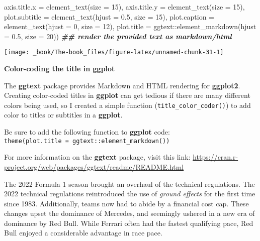 \documentclass[
]{book}
\newenvironment{Shaded}{\begin{snugshade}}{\end{snugshade}}
\newcommand{\AttributeTok}[1]{\textcolor[rgb]{0.77,0.63,0.00}{#1}}
\newcommand{\DecValTok}[1]{\textcolor[rgb]{0.00,0.00,0.81}{#1}}
\newcommand{\DocumentationTok}[1]{\textcolor[rgb]{0.56,0.35,0.01}{\textbf{\textit{#1}}}}
\newcommand{\FloatTok}[1]{\textcolor[rgb]{0.00,0.00,0.81}{#1}}
\newcommand{\FunctionTok}[1]{\textcolor[rgb]{0.00,0.00,0.00}{#1}}
\newcommand{\NormalTok}[1]{#1}
\newcommand{\SpecialCharTok}[1]{\textcolor[rgb]{0.00,0.00,0.00}{#1}}
\begin{document}
\begin{Shaded}
\begin{Highlighting}[]
        \AttributeTok{axis.title.x =} \FunctionTok{element\_text}\NormalTok{(}\AttributeTok{size =} \DecValTok{15}\NormalTok{),}
        \AttributeTok{axis.title.y =} \FunctionTok{element\_text}\NormalTok{(}\AttributeTok{size =} \DecValTok{15}\NormalTok{),}
         \AttributeTok{plot.subtitle =} \FunctionTok{element\_text}\NormalTok{(}\AttributeTok{hjust =} \FloatTok{0.5}\NormalTok{, }\AttributeTok{size =} \DecValTok{15}\NormalTok{),}
         \AttributeTok{plot.caption =} \FunctionTok{element\_text}\NormalTok{(}\AttributeTok{hjust =} \DecValTok{0}\NormalTok{, }\AttributeTok{size =} \DecValTok{12}\NormalTok{),}
        \AttributeTok{plot.title =}\NormalTok{ ggtext}\SpecialCharTok{::}\FunctionTok{element\_markdown}\NormalTok{(}\AttributeTok{hjust =} \FloatTok{0.5}\NormalTok{, }\AttributeTok{size =} \DecValTok{20}\NormalTok{)) }\DocumentationTok{\#\# render the provided text as markdown/html}
\end{Highlighting}
\end{Shaded}

\begin{center}\texttt{[image: \_book/The-book\_files/figure-latex/unnamed-chunk-31-1]} \end{center}

\begin{blackbox}

\begin{center}
\textbf{Color-coding the title in ggplot}

\end{center}

The \textbf{ggtext} package provides Markdown and HTML rendering for \textbf{ggplot2}. Creating color-coded titles in \textbf{ggplot} can get tedious if there are many different colors being used, so I created a simple function (\texttt{title\_color\_coder()}) to add color to titles or subtitles in a \textbf{ggplot}.

Be sure to add the following function to \textbf{ggplot} code: \texttt{theme(plot.title\ =\ ggtext::element\_markdown())}

For more information on the \textbf{ggtext} package, visit this link: \url{https://cran.r-project.org/web/packages/ggtext/readme/README.html}

\end{blackbox}

The 2022 Formula 1 season brought an overhaul of the technical regulations. The 2022 technical regulations reintroduced the use of \emph{ground effects} for the first time since 1983. Additionally, teams now had to abide by a financial cost cap. These changes upset the dominance of Mercedes, and seemingly ushered in a new era of dominance by Red Bull. While Ferrari often had the fastest qualifying pace, Red Bull enjoyed a considerable advantage in race pace.
\end{document}
